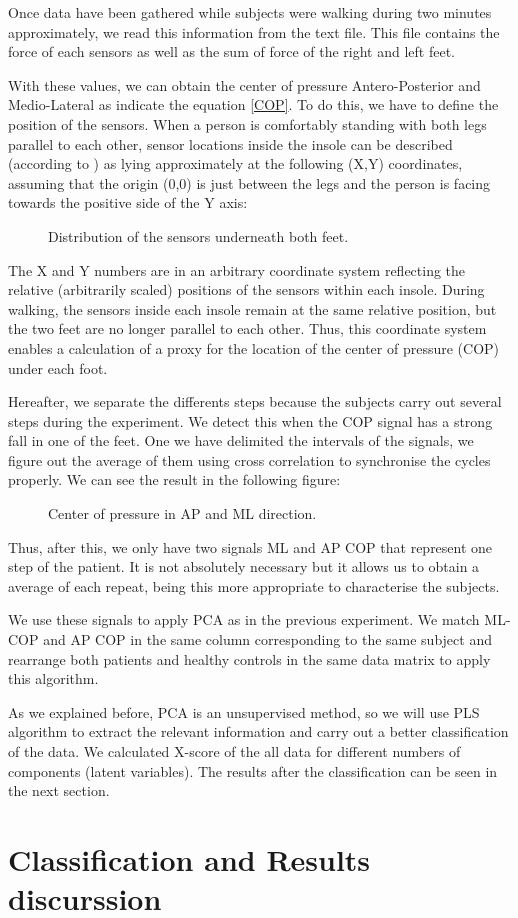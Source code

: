 Once data have been gathered while subjects were walking during two minutes approximately, we read this information from the text file. This file contains the force of each sensors as well as the sum of force of the right and left feet.

With these values, we can obtain the center of pressure Antero-Posterior and Medio-Lateral  as indicate the equation \ref*{COP}. To do this, we have to define the position of the sensors. When a person is comfortably standing with both legs parallel to each other, sensor locations inside the insole can be described (according to \cite{Instr6}) as lying approximately at the following (X,Y) coordinates, assuming that the origin (0,0) is just between the legs and the person is facing towards the positive side of the Y axis:
\begin{figure}[H]
	\centering
	\caption{Distribution of the sensors underneath both feet.}
	\label{fig:DistributionSensors}
\end{figure}

The X and Y numbers are in an arbitrary coordinate system reflecting the relative (arbitrarily scaled) positions of the sensors within each insole. During walking, the sensors inside each insole remain at the same relative position, but the two feet are no longer parallel to each other. Thus, this coordinate system enables a calculation of a proxy for the location of the center of pressure (COP) under each foot.

Hereafter, we separate the differents steps because the subjects carry out several steps during the experiment. We detect this when the COP signal has a strong fall in one of the feet. One we have delimited the intervals of the signals, we figure out the average of them using cross correlation to synchronise the cycles properly. We can see the result in the following figure:
\begin{figure}[H]
	\centering
	\caption{Center of pressure in AP and ML direction.}
	\label{fig:COP}
\end{figure}

Thus, after this, we only have two signals ML and AP COP that represent one step of the patient. It is not absolutely necessary but it allows us to obtain a average of each repeat, being this more appropriate to characterise the subjects.

We use these signals to apply PCA as in the previous experiment. We match ML-COP and AP COP in the same column corresponding to the same subject and rearrange both patients and healthy controls in the same data matrix to apply this algorithm.

As we explained before, PCA is an unsupervised method, so we will use PLS algorithm to extract the relevant information and carry out a better classification of the data. We calculated X-score of the all data for different numbers of components (latent variables). The results after the classification can be seen in the next section.


\section{Classification and Results discurssion}